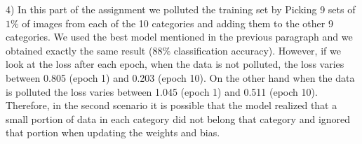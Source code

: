 \documentclass[12pt]{article}
\begin{document}
		
		4) In this part of the assignment we polluted the training set by Picking 9 sets of $1\%$ of images from each of the 10 categories and adding them to the other 9 categories. We used the best model mentioned in the previous paragraph and we obtained exactly the same result ($88\%$ classification accuracy). However, if we look at the loss after each epoch, when the data is not polluted, the loss varies between 0.805 (epoch 1) and 0.203 (epoch 10). On the other hand when the data is polluted the loss varies between 1.045 (epoch 1) and 0.511 (epoch 10). Therefore, in the second scenario it is possible that the model realized that a small portion of data in each category did not belong that category and ignored that portion when updating the weights and bias.  
	
\end{document}
